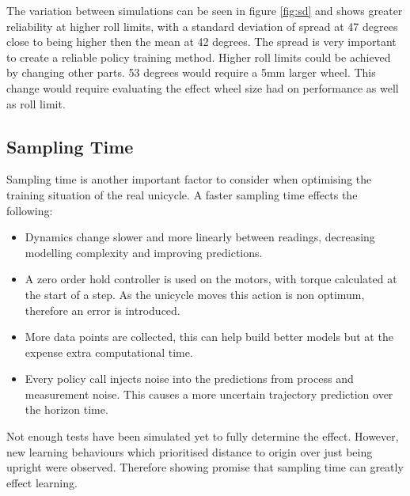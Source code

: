 \documentclass[twoside,twocolumn,12pt]{article}
\begin{document}
\newline
The variation between simulations can be seen in figure \ref{fig:sd} and shows greater reliability at higher roll limits, with a standard deviation of spread at 47 degrees close to being higher then the mean at 42 degrees. The spread is very important to create a reliable policy training method.
\newline
Higher roll limits could be achieved by changing other parts. 53 degrees would require a 5mm larger wheel. This change would require evaluating the effect wheel size had on performance as well as roll limit.

\subsection{Sampling Time}
Sampling time is another important factor to consider when optimising the training situation of the real unicycle. A faster sampling time effects the following:

\begin{itemize}
\item Dynamics change slower and more linearly between readings, decreasing modelling complexity and improving predictions.
\item A zero order hold controller is used on the motors, with torque calculated at the start of a step. As the unicycle moves this action is non optimum, therefore an error is introduced.
\item More data points are collected, this can help build better models but at the expense extra computational time.
\item Every policy call injects noise into the predictions from process and measurement noise. This causes a more uncertain trajectory prediction over the horizon time.
\end{itemize}

Not enough tests have been simulated yet to fully determine the effect. However, new learning behaviours which prioritised distance to origin over just being upright were observed. Therefore showing promise that sampling time can greatly effect learning.
\end{document}
